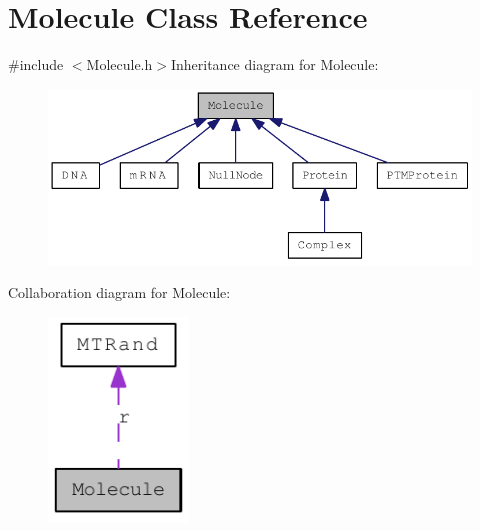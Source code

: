 \hypertarget{classMolecule}{
\section{Molecule Class Reference}
\label{classMolecule}
}


{\ttfamily \#include $<$Molecule.h$>$}Inheritance diagram for Molecule:\nopagebreak
\begin{figure}[H]
\begin{center}
\leavevmode
\includegraphics[width=388pt]{classMolecule__inherit__graph}
\end{center}
\end{figure}
Collaboration diagram for Molecule:\nopagebreak
\begin{figure}[H]
\begin{center}
\leavevmode
\includegraphics[width=106pt]{classMolecule__coll__graph}
\end{center}
\end{figure}
